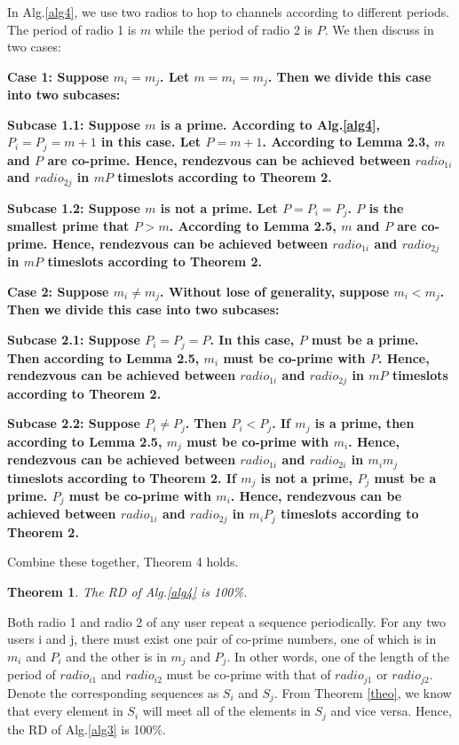 \documentclass[10pt, conference, letterpaper]{IEEEtran}
\newtheorem{theorem}{Theorem}
\begin{document}
\begin{IEEEproof}
In Alg.\ref{alg4}, we use two radios to hop to channels according to different periods. The period of radio 1 is $m$ while the period of radio 2 is $P$. We then discuss in two cases:

\bfseries Case 1: \mdseries Suppose $m_i = m_j$. Let $m = m_i = m_j$. Then we divide this case into two subcases:

\bfseries Subcase 1.1: \mdseries Suppose $m$ is a prime. According to Alg.\ref{alg4}, $P_i = P_j = m + 1$ in this case. Let $P = m+1$. According to Lemma 2.3, $m$ and $P$ are co-prime. Hence, rendezvous can be achieved between $radio_{1i}$ and $radio_{2j}$ in $mP$ timeslots according to Theorem 2.

\bfseries Subcase 1.2: \mdseries Suppose $m$ is not a prime. Let $P =P_i=P_j$. $P$ is the smallest prime that $P > m$. According to Lemma 2.5, $m$ and $P$ are co-prime. Hence, rendezvous can be achieved between $radio_{1i}$ and $radio_{2j}$ in $mP$ timeslots according to Theorem 2.

\bfseries Case 2: \mdseries Suppose $m_i \ne m_j$.  Without lose of generality, suppose $m_i < m_j$. Then we divide this case into two subcases:

\bfseries Subcase 2.1: \mdseries Suppose $P_i = P_j = P$. In this case, $P$ must be a prime. Then according to Lemma 2.5, $m_i$ must be co-prime with $P$. Hence, rendezvous can be achieved between $radio_{1i}$ and $radio_{2j}$ in $mP$ timeslots according to Theorem 2.

\bfseries Subcase 2.2: \mdseries Suppose $P_i \ne P_j$. Then $P_i < P_j$. If $m_j$ is a prime, then according to Lemma 2.5, $m_j$ must be co-prime with $m_i$. Hence, rendezvous can be achieved between $radio_{1i}$ and $radio_{2i}$ in $m_im_j$ timeslots according to Theorem 2.
If $m_j$ is not a prime, $P_j$ must be a prime. $P_j$ must be co-prime with $m_i$. Hence, rendezvous can be achieved between $radio_{1i}$ and $radio_{2j}$ in $m_iP_j$ timeslots according to Theorem 2.

Combine these together, Theorem 4 holds.
\end{IEEEproof}

\begin{theorem}
The RD of Alg.\ref{alg4} is 100\%.
\end{theorem}

\begin{IEEEproof}
Both radio 1 and radio 2 of any user repeat a sequence periodically. For any two users i and j, there must exist one pair of co-prime numbers, one of which is in $m_i$ and $P_i$ and the other is in $m_j$ and $P_j$. In other words, one of the length of the period of $radio_{i1}$ and $radio_{i2}$ must be co-prime with that of $radio_{j1}$ or $radio_{j2}$. Denote the corresponding sequences as $S_i$ and $S_j$. From Theorem \ref{theo}, we know that every element in $S_i$ will meet all of the elements in $S_j$ and vice versa. Hence, the RD of Alg.\ref{alg3} is 100\%.
\end{IEEEproof}
\end{document}
